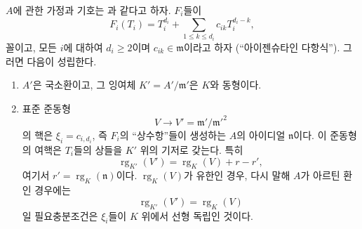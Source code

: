 \begin{proposition}[22.4.3]
\label{0.22.4.3-ko}
$A$에 관한 가정과 기호는 과 같다고 하자. $F_i$들이
\begin{equation}
\label{0.22.4.3.1-ko}
  F_i(T_i)=T_i^{d_i}+\sum_{1\leqslant k\leqslant d_i}
  c_{ik}T_i^{d_i-k},
  \tag{22.4.3.1}
\end{equation}
꼴이고, 모든 $i$에 대하여 $d_i\geqslant2$이며
$c_{ik}\in\mathfrak m$이라고 하자 (``아이젠슈타인 다항식''). 그러면
다음이 성립한다.
\begin{enumerate}
  \item[(i)] $A'$은 국소환이고, 그 잉여체
  $K'=A'/\mathfrak m'$은 $K$와 동형이다.


  \item[(ii)] 표준 준동형
  \[
    V\longrightarrow V'=\mathfrak m'/\mathfrak m'^2
  \]
  의 핵은 $\xi_i=c_{i,d_i}$, 즉 $F_i$의 ``상수항''들이 생성하는
  $A$의 아이디얼 $\mathfrak n$이다. 이 준동형의 여핵은 $T_i$들의
  상들을 $K'$ 위의 기저로 갖는다. 특히
  \begin{equation}
  \label{0.22.4.3.2-ko}
    \operatorname{rg}_{K'}(V')=\operatorname{rg}_K(V)+r-r',
    \tag{22.4.3.2}
  \end{equation}
  여기서 $r'=\operatorname{rg}_K(\mathfrak n)$이다.
  $\operatorname{rg}_K(V)$가 유한인 경우, 다시 말해 $A$가 아르틴
  환인 경우에는
  \[
    \operatorname{rg}_{K'}(V')=\operatorname{rg}_K(V)
  \]
  일 필요충분조건은 $\xi_i$들이 $K$ 위에서 선형 독립인 것이다.
\end{enumerate}
\end{proposition}

